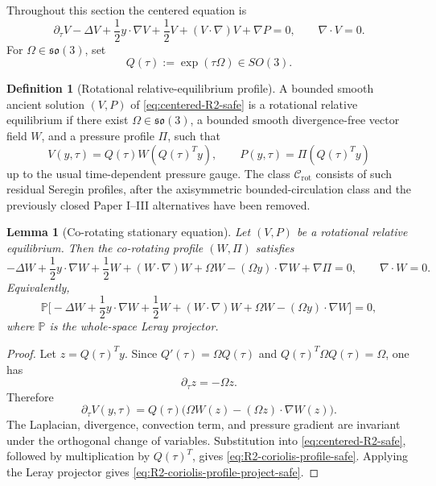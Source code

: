 \documentclass[11pt]{amsart}
\numberwithin{equation}{section}
\theoremstyle{plain}
\newtheorem{lemma}[theorem]{Lemma}
\theoremstyle{definition}
\newtheorem{definition}[theorem]{Definition}
\theoremstyle{remark}
\newcommand{\Crot}{\mathcal C_{\mathrm{rot}}}
\begin{document}
Throughout this section the centered equation is
\begin{equation}\label{eq:centered-R2-safe}
   \partial_\tau V-\Delta V+\frac12 y\cdot\nabla V+\frac12 V
   +(V\cdot\nabla)V+\nabla P=0,
   \qquad \nabla\cdot V=0 .
\end{equation}
For \(\Omega\in\mathfrak{so}(3)\), set
\begin{equation}\label{eq:rotation-group-R2-safe}
   Q(\tau):=\exp(\tau\Omega)\in SO(3).
\end{equation}

\begin{definition}[Rotational relative-equilibrium profile]
\label{def:R2-relative-profile-safe}
A bounded smooth ancient solution \((V,P)\) of \eqref{eq:centered-R2-safe} is a
rotational relative equilibrium if there exist
\(\Omega\in\mathfrak{so}(3)\), a bounded smooth divergence-free vector field
\(W\), and a pressure profile \(\Pi\), such that
\begin{equation}\label{eq:R2-relative-form-safe}
   V(y,\tau)=Q(\tau)W(Q(\tau)^Ty),
   \qquad
   P(y,\tau)=\Pi(Q(\tau)^Ty)
\end{equation}
up to the usual time-dependent pressure gauge.
The class \(\Crot\) consists of such residual Seregin profiles, after the
axisymmetric bounded-circulation class and the previously closed Paper I--III
alternatives have been removed.
\end{definition}

\begin{lemma}[Co-rotating stationary equation]
\label{lem:co-rotating-equation-safe}
Let \((V,P)\) be a rotational relative equilibrium.  Then the co-rotating
profile \((W,\Pi)\) satisfies
\begin{equation}\label{eq:R2-coriolis-profile-safe}
   -\Delta W+\frac12 y\cdot\nabla W+\frac12 W
   +(W\cdot\nabla)W
   +\Omega W-(\Omega y)\cdot\nabla W
   +\nabla\Pi=0,
   \qquad \nabla\cdot W=0 .
\end{equation}
Equivalently,
\begin{equation}\label{eq:R2-coriolis-profile-project-safe}
   \mathbb P\Big[
   -\Delta W+\frac12 y\cdot\nabla W+\frac12 W
   +(W\cdot\nabla)W
   +\Omega W-(\Omega y)\cdot\nabla W
   \Big]=0,
\end{equation}
where \(\mathbb P\) is the whole-space Leray projector.
\end{lemma}

\begin{proof}
Let \(z=Q(\tau)^Ty\).  Since \(Q'(\tau)=\Omega Q(\tau)\) and
\(Q(\tau)^T\Omega Q(\tau)=\Omega\), one has
\[
   \partial_\tau z=-\Omega z.
\]
Therefore
\[
   \partial_\tau V(y,\tau)
   =Q(\tau)\Big(\Omega W(z)-(\Omega z)\cdot\nabla W(z)\Big).
\]
The Laplacian, divergence, convection term, and pressure gradient are invariant
under the orthogonal change of variables.  Substitution into
\eqref{eq:centered-R2-safe}, followed by multiplication by \(Q(\tau)^T\), gives
\eqref{eq:R2-coriolis-profile-safe}.  Applying the Leray projector gives
\eqref{eq:R2-coriolis-profile-project-safe}.
\end{proof}
\end{document}
